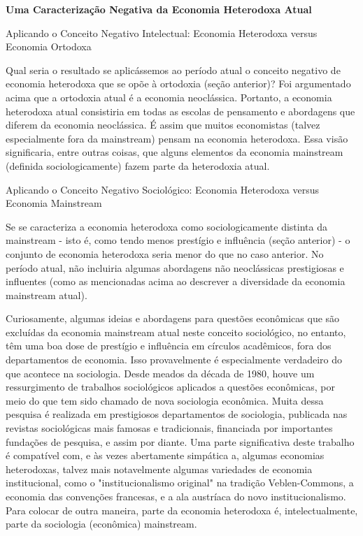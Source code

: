 \documentclass[a4paper,12pt]{article}[abntex2]
\begin{document}
\textbf{Uma Caracterização Negativa da Economia Heterodoxa Atual}

Aplicando o Conceito Negativo Intelectual: Economia Heterodoxa versus Economia Ortodoxa

Qual seria o resultado se aplicássemos ao período atual o conceito negativo de economia heterodoxa que se opõe à ortodoxia (seção anterior)? Foi argumentado acima que a ortodoxia atual é a economia neoclássica. Portanto, a economia heterodoxa atual consistiria em todas as escolas de pensamento e abordagens que diferem da economia neoclássica. É assim que muitos economistas (talvez especialmente fora da mainstream) pensam na economia heterodoxa. Essa visão significaria, entre outras coisas, que alguns elementos da economia mainstream (definida sociologicamente) fazem parte da heterodoxia atual.

Aplicando o Conceito Negativo Sociológico: Economia Heterodoxa versus Economia Mainstream

Se se caracteriza a economia heterodoxa como sociologicamente distinta da mainstream - isto é, como tendo menos prestígio e influência (seção anterior) - o conjunto de economia heterodoxa seria menor do que no caso anterior. No período atual, não incluiria algumas abordagens não neoclássicas prestigiosas e influentes (como as mencionadas acima ao descrever a diversidade da economia mainstream atual).

Curiosamente, algumas ideias e abordagens para questões econômicas que são excluídas da economia mainstream atual neste conceito sociológico, no entanto, têm uma boa dose de prestígio e influência em círculos acadêmicos, fora dos departamentos de economia. Isso provavelmente é especialmente verdadeiro do que acontece na sociologia. Desde meados da década de 1980, houve um ressurgimento de trabalhos sociológicos aplicados a questões econômicas, por meio do que tem sido chamado de nova sociologia econômica. Muita dessa pesquisa é realizada em prestigiosos departamentos de sociologia, publicada nas revistas sociológicas mais famosas e tradicionais, financiada por importantes fundações de pesquisa, e assim por diante. Uma parte significativa deste trabalho é compatível com, e às vezes abertamente simpática a, algumas economias heterodoxas, talvez mais notavelmente algumas variedades de economia institucional, como o "institucionalismo original" na tradição Veblen-Commons, a economia das convenções francesas, e a ala austríaca do novo institucionalismo. Para colocar de outra maneira, parte da economia heterodoxa é, intelectualmente, parte da sociologia (econômica) mainstream.
\end{document}
